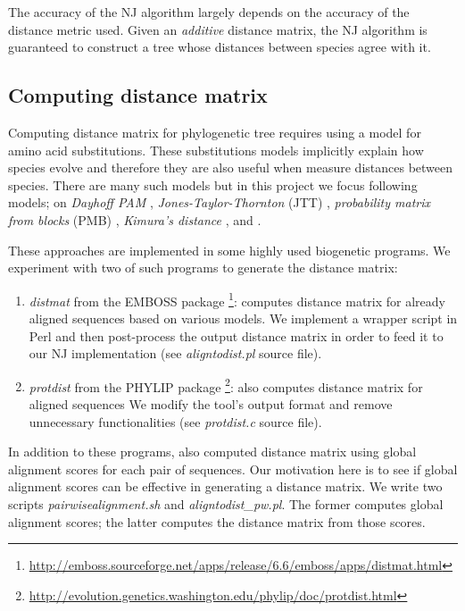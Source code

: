 \documentclass[11pt,letterpaper]{article}
\theoremstyle{definition}
\begin{document}
The accuracy of the NJ algorithm largely depends on the accuracy of the distance metric used. Given an \textit{additive} distance matrix, the NJ algorithm is guaranteed to construct a tree whose distances between species agree with it. 

\subsection{Computing distance matrix}\label{distance}


Computing distance matrix for phylogenetic tree requires using a model for amino acid substitutions. These substitutions models implicitly explain how species evolve and therefore they are also useful when measure distances between species. There are many such models but in this project we focus following models; on \textit{Dayhoff PAM} \cite{kosiol2005different}, \textit{Jones-Taylor-Thornton} (JTT) \cite{jones1992rapid}, \textit{probability matrix from blocks} (PMB) \cite{veerassamy2003transition}, \textit{Kimura's distance} \cite{kimura1983rare}, and  \cite{jukes1969evolution}. 

These approaches are implemented in some highly used biogenetic programs. We experiment with two of such programs to generate the distance matrix:
\begin{enumerate}
	\item \textit{distmat} from the EMBOSS package \cite{rice2000emboss}  \footnote{\url{http://emboss.sourceforge.net/apps/release/6.6/emboss/apps/distmat.html}}: computes distance matrix for already aligned sequences based on various models. We implement a wrapper script in Perl and then post-process the output distance matrix in order to feed it to our NJ implementation (see \textit{aligntodist.pl} source file).
    \item \textit{protdist} from the PHYLIP package \footnote{\url{http://evolution.genetics.washington.edu/phylip/doc/protdist.html}}: also computes distance matrix for aligned sequences We modify the tool's output format and remove unnecessary functionalities (see \textit{protdist.c} source file).
\end{enumerate}

In addition to these programs, also computed distance matrix using global alignment scores for each pair of sequences. Our motivation here is to see if global alignment scores can be effective in generating a distance matrix. We write two scripts \textit{pairwisealignment.sh} and \textit{aligntodist\_pw.pl}. The former computes global alignment scores; the latter computes the distance matrix from those scores.
\end{document}
